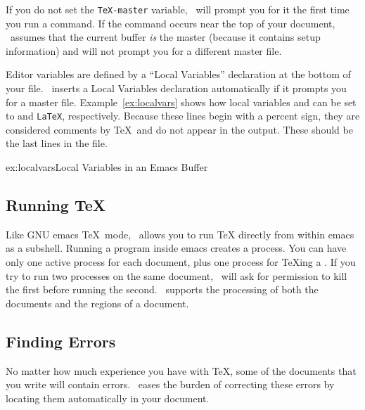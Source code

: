 If you do not set the \verb|TeX-master| variable, \auctex\ will prompt
you for it the first time you run a command. If the
 command occurs near the top of your document,
\auctex\ assumes that the current buffer \textit{is} the master
(because it contains setup information) and will not
prompt you for a different master file.

Editor variables are defined by a ``Local Variables'' declaration at
the bottom of your file.  \auctex\ inserts a Local Variables
declaration automatically if it prompts you for a master file.
Example~\ref{ex:localvars} shows how local variables
and 
can be set to
 and \verb|LaTeX|, respectively.  Because
these lines begin with a percent sign, they are considered comments by
\TeX\ and do not appear in the output.  These should be 
the last lines in the file.

\begin{example}{ex:localvars}{Local Variables in an Emacs Buffer}
\end{example}

\subsection{Running \TeX}

Like GNU emacs \TeX\ mode, \auctex\ allows you to 
run \TeX{} directly
from within emacs as a subshell.  Running a program inside emacs
creates a process.  You 
can have only one active process for
each document, plus one process for \TeX{}ing a .  If you 
try to
run two processes on the same document, \auctex\ will ask for
permission to kill the first before running the second.  \auctex\ supports
the processing of both the documents and the regions of a document.

\subsection{Finding Errors}

No matter how much experience you have with \TeX, some of the
documents that you write will contain 
errors.  \auctex\ eases the
burden of correcting these errors by locating them automatically
in your document.  
\newpage

